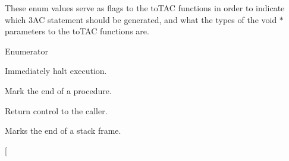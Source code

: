 These enum values serve as flags to the to\-T\-A\-C functions in order to indicate which 3\-A\-C statement should be generated, and what the types of the void $\ast$ parameters to the to\-T\-A\-C functions are. \begin{Desc}
\item[Enumerator]\par
\begin{description}
\item[{\em 
\hypertarget{classTAC__Generator_a3942f3e280fb83e44ad85eb13d56dfb5a8e16b137fe321cada85cb3ab596934f7}{H\-A\-L\-T}\label{classTAC__Generator_a3942f3e280fb83e44ad85eb13d56dfb5a8e16b137fe321cada85cb3ab596934f7}
}]Immediately halt execution. \item[{\em 
\hypertarget{classTAC__Generator_a3942f3e280fb83e44ad85eb13d56dfb5ab8cc9678456e68db56838ba762eb03cf}{E\-N\-D\-P\-R\-O\-C}\label{classTAC__Generator_a3942f3e280fb83e44ad85eb13d56dfb5ab8cc9678456e68db56838ba762eb03cf}
}]Mark the end of a procedure. \item[{\em 
\hypertarget{classTAC__Generator_a3942f3e280fb83e44ad85eb13d56dfb5a0e868fa94bac0750a62dfa98d0f56510}{R\-E\-T\-U\-R\-N}\label{classTAC__Generator_a3942f3e280fb83e44ad85eb13d56dfb5a0e868fa94bac0750a62dfa98d0f56510}
}]Return control to the caller. \item[{\em 
\hypertarget{classTAC__Generator_a3942f3e280fb83e44ad85eb13d56dfb5a77c34b42184355e533cdb9105a1c779a}{E\-N\-D\-F\-R\-A\-M\-E}\label{classTAC__Generator_a3942f3e280fb83e44ad85eb13d56dfb5a77c34b42184355e533cdb9105a1c779a}
}]Marks the end of a stack frame. \item[{\em 
}
\end{description}
\end{Desc}
